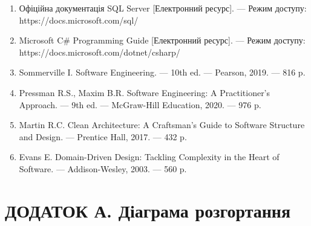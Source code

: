 \documentclass[14pt,a4paper]{extarticle}
\begin{document}
\begin{enumerate}
    \item Офіційна документація SQL Server [Електронний ресурс]. --- Режим доступу: https://docs.microsoft.com/sql/
    
    \item Microsoft C\# Programming Guide [Електронний ресурс]. --- Режим доступу: https://docs.microsoft.com/dotnet/csharp/
    
    \item Sommerville I. Software Engineering. --- 10th ed. --- Pearson, 2019. --- 816 p.
    
    \item Pressman R.S., Maxim B.R. Software Engineering: A Practitioner's Approach. --- 9th ed. --- McGraw-Hill Education, 2020. --- 976 p.
    
    \item Martin R.C. Clean Architecture: A Craftsman's Guide to Software Structure and Design. --- Prentice Hall, 2017. --- 432 p.
    
    \item Evans E. Domain-Driven Design: Tackling Complexity in the Heart of Software. --- Addison-Wesley, 2003. --- 560 p.
\end{enumerate}

\newpage
\appendix
\section{ДОДАТОК А. Діаграма розгортання}
\end{document}
